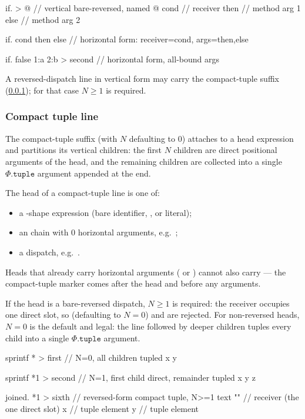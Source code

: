 \begin{ffcode}
if. > @                    // vertical bare-reversed, named @
  cond                     //   receiver
  then                     //   method arg 1
  else                     //   method arg 2

if. cond then else         // horizontal form: receiver=cond, args=then,else

if. false 1:a 2:b > second // horizontal form, all-bound args
\end{ffcode}

A reversed-dispatch line in vertical form may carry the compact-tuple suffix
   (\cref{sec:syntax:compact}); for that case \(N\geq 1\) is required.

\subsubsection{Compact tuple line}\label{sec:syntax:compact}

The compact-tuple suffix  (with \(N\) defaulting to \(0\))
  attaches to a head expression and partitions its vertical children:
  the first \(N\) children are direct positional arguments of the head,
  and the remaining children are collected into a single
  \(\Phi.\mathtt{tuple}\) argument appended at the end.

The head of a compact-tuple line is one of:
\begin{itemize}
  \item a -shape expression (bare identifier, \ff{*}, or literal);
  \item an  chain with 0 horizontal arguments,
    e.g.\ ;
  \item a  dispatch, e.g.\ .
\end{itemize}

Heads that already carry horizontal arguments ( or
  ) cannot also carry  ---
  the compact-tuple marker comes after the head and before any arguments.

If the head is a bare-reversed dispatch, \(N\geq 1\) is required:
  the receiver occupies one direct slot,
  so  (defaulting to \(N=0\)) and  are rejected.
For non-reversed heads, \(N=0\) is the default and legal:
  the line  followed by deeper children tuples every child
  into a single \(\Phi.\mathtt{tuple}\) argument.

\begin{ffcode}
sprintf * > first         // N=0, all children tupled
  x
  y

sprintf *1 > second       // N=1, first child direct, remainder tupled
  x
  y
  z

joined. *1 > sixth        // reversed-form compact tuple, N>=1
  text ""                 //   receiver (the one direct slot)
  x                       //   tuple element
  y                       //   tuple element
\end{ffcode}

